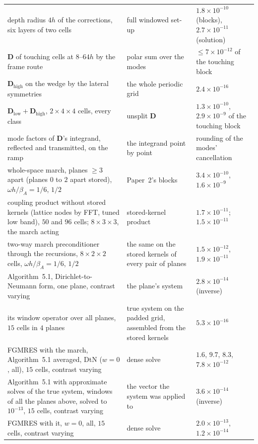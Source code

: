 \documentclass[11pt,a4paper]{article}
\begin{document}
\begin{longtable}{>{\raggedright\arraybackslash}p{}>{\raggedright\arraybackslash}p{}>{\raggedright\arraybackslash}p{}}
depth radius $4h$ of the corrections, six layers of two cells & full windowed set-up & $1.8\times10^{-10}$ (blocks), $2.7\times10^{-11}$ (solution) \\
$\mathbf D$ of touching cells at $8$--$64h$ by the frame route & polar sum over the modes & $\le7\times10^{-12}$ of the touching block \\
$\mathbf D_{\mathrm{high}}$ on the wedge by the lateral symmetries & the whole periodic grid & $2.4\times10^{-16}$ \\
$\mathbf D_{\mathrm{low}}+\mathbf D_{\mathrm{high}}$, $2\times4\times4$ cells, every class & unsplit $\mathbf D$ & $1.3\times10^{-10}$, $2.9\times10^{-9}$ of the touching block \\
mode factors of $\mathbf D$'s integrand, reflected and transmitted, on the ramp & the integrand point by point & rounding of the modes' cancellation \\
whole-space march, planes $\ge3$ apart (planes $0$ to $2$ apart stored), $\omega h/\beta_A=1/6$, $1/2$ & Paper~2's blocks & $3.4\times10^{-10}$, $1.6\times10^{-9}$ \\
coupling product without stored kernels (lattice nodes by FFT, tuned low band), $50$ and $96$ cells; $8\times3\times3$, the march acting & stored-kernel product & $1.7\times10^{-11}$; $1.5\times10^{-11}$ \\
two-way march preconditioner through the recursions, $8\times2\times2$ cells, $\omega h/\beta_A=1/6$, $1/2$ & the same on the stored kernels of every pair of planes & $1.5\times10^{-12}$, $1.9\times10^{-11}$ \\
Algorithm~5.1, Dirichlet-to-Neumann form, one plane, contrast varying & the plane's system & $2.8\times10^{-14}$ (inverse) \\
its window operator over all planes, $15$ cells in $4$ planes & true system on the padded grid, assembled from the stored kernels & $5.3\times10^{-16}$ \\
FGMRES with the march, Algorithm~5.1 averaged, DtN ($w=0$, all), $15$ cells, contrast varying & dense solve & $1.6$, $9.7$, $8.3$, $7.8\times10^{-12}$ \\
Algorithm~5.1 with approximate solves of the true system, windows of all the planes above, solved to $10^{-13}$, $15$ cells, contrast varying & the vector the system was applied to & $3.6\times10^{-14}$ (inverse) \\
FGMRES with it, $w=0$, all, $15$ cells, contrast varying & dense solve & $2.0\times10^{-13}$, $1.2\times10^{-14}$ \\

\end{longtable}
\end{document}
